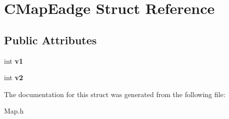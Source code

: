 \hypertarget{structCMapEadge}{}\section{C\+Map\+Eadge Struct Reference}
\label{structCMapEadge}
\subsection*{Public Attributes}
\begin{DoxyCompactItemize}
\item 
int {\bfseries v1}\hypertarget{structCMapEadge_a85c30f04dd7abacca026d531736bfe97}{}\label{structCMapEadge_a85c30f04dd7abacca026d531736bfe97}

\item 
int {\bfseries v2}\hypertarget{structCMapEadge_a95c056915c290eca37cd87eb888c3897}{}\label{structCMapEadge_a95c056915c290eca37cd87eb888c3897}

\end{DoxyCompactItemize}


The documentation for this struct was generated from the following file\+:\begin{DoxyCompactItemize}
\item 
Map.\+h\end{DoxyCompactItemize}
